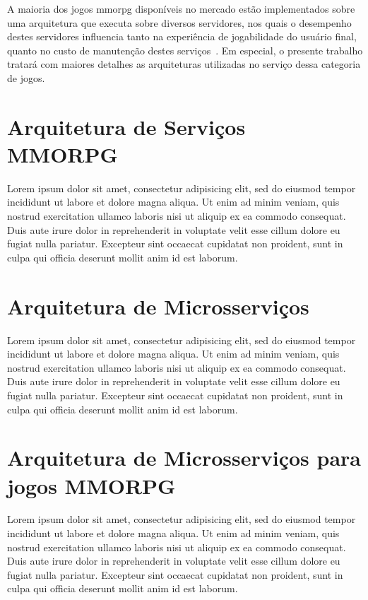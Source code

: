A maioria dos jogos \ac{mmorpg} disponíveis no mercado estão implementados sobre uma arquitetura que executa sobre diversos servidores\cite{stephenclarkewillson2017}, nos quais o desempenho destes servidores influencia tanto na experiência de jogabilidade do usuário final, quanto no custo de manutenção destes serviços~\cite{1417630}.
%
Em especial, o presente trabalho tratará com maiores detalhes as arquiteturas utilizadas no serviço dessa categoria de jogos.


\section{Arquitetura de Serviços MMORPG}

Lorem ipsum dolor sit amet, consectetur adipisicing elit, sed do eiusmod tempor incididunt ut labore et dolore magna aliqua. Ut enim ad minim veniam, quis nostrud exercitation ullamco laboris nisi ut aliquip ex ea commodo consequat. Duis aute irure dolor in reprehenderit in voluptate velit esse cillum dolore eu fugiat nulla pariatur. Excepteur sint occaecat cupidatat non proident, sunt in culpa qui officia deserunt mollit anim id est laborum.

\section{Arquitetura de Microsserviços}

Lorem ipsum dolor sit amet, consectetur adipisicing elit, sed do eiusmod tempor incididunt ut labore et dolore magna aliqua. Ut enim ad minim veniam, quis nostrud exercitation ullamco laboris nisi ut aliquip ex ea commodo consequat. Duis aute irure dolor in reprehenderit in voluptate velit esse cillum dolore eu fugiat nulla pariatur. Excepteur sint occaecat cupidatat non proident, sunt in culpa qui officia deserunt mollit anim id est laborum.


\section{Arquitetura de Microsserviços para jogos MMORPG}

Lorem ipsum dolor sit amet, consectetur adipisicing elit, sed do eiusmod tempor incididunt ut labore et dolore magna aliqua. Ut enim ad minim veniam, quis nostrud exercitation ullamco laboris nisi ut aliquip ex ea commodo consequat. Duis aute irure dolor in reprehenderit in voluptate velit esse cillum dolore eu fugiat nulla pariatur. Excepteur sint occaecat cupidatat non proident, sunt in culpa qui officia deserunt mollit anim id est laborum.

